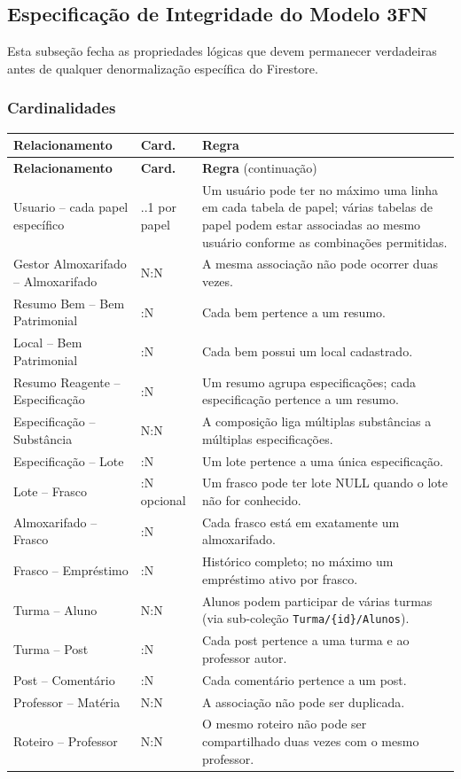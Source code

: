 \subsection{Especificação de Integridade do Modelo 3FN}
Esta subseção fecha as propriedades lógicas que devem permanecer verdadeiras antes de qualquer denormalização específica do Firestore.

\subsubsection{Cardinalidades}
\begin{longtable}{>{\raggedright\arraybackslash}p{} >{\centering\arraybackslash}p{} >{\raggedright\arraybackslash}p{}}
\toprule
\textbf{Relacionamento} & \textbf{Card.} & \textbf{Regra}\\
\midrule
\endfirsthead
\toprule
\textbf{Relacionamento} & \textbf{Card.} & \textbf{Regra} (continuação)\\
\midrule
\endhead
\bottomrule
\endfoot
Usuario -- cada papel específico & 0..1 por papel & Um usuário pode ter no máximo uma linha em cada tabela de papel; várias tabelas de papel podem estar associadas ao mesmo usuário conforme as combinações permitidas.\\
Gestor Almoxarifado -- Almoxarifado & N:N & A mesma associação não pode ocorrer duas vezes.\\
Resumo Bem -- Bem Patrimonial & 1:N & Cada bem pertence a um resumo.\\
Local -- Bem Patrimonial & 1:N & Cada bem possui um local cadastrado.\\
Resumo Reagente -- Especificação & 1:N & Um resumo agrupa especificações; cada especificação pertence a um resumo.\\
Especificação -- Substância & N:N & A composição liga múltiplas substâncias a múltiplas especificações.\\
Especificação -- Lote & 1:N & Um lote pertence a uma única especificação.\\
Lote -- Frasco & 1:N opcional & Um frasco pode ter lote NULL quando o lote não for conhecido.\\
Almoxarifado -- Frasco & 1:N & Cada frasco está em exatamente um almoxarifado.\\
Frasco -- Empréstimo & 1:N & Histórico completo; no máximo um empréstimo ativo por frasco.\\
Turma -- Aluno & N:N & Alunos podem participar de várias turmas (via sub-coleção \texttt{Turma/\{id\}/Alunos}).\\
Turma -- Post & 1:N & Cada post pertence a uma turma e ao professor autor.\\
Post -- Comentário & 1:N & Cada comentário pertence a um post.\\
Professor -- Matéria & N:N & A associação não pode ser duplicada.\\
Roteiro -- Professor & N:N & O mesmo roteiro não pode ser compartilhado duas vezes com o mesmo professor.\\
\bottomrule
\end{longtable}

